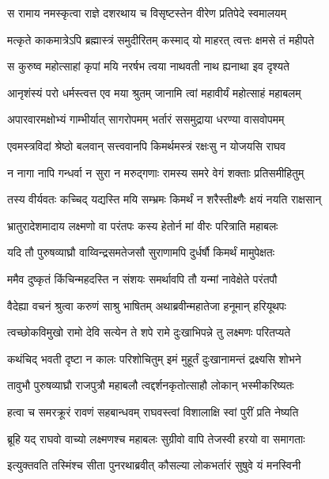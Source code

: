 \twolineshloka
{स रामाय नमस्कृत्वा राज्ञे दशरथाय च}
{विसृष्टस्तेन वीरेण प्रतिपेदे स्वमालयम्} %

\twolineshloka
{मत्कृते काकमात्रेऽपि ब्रह्मास्त्रं समुदीरितम्}
{कस्माद् यो माहरत् त्वत्तः क्षमसे तं महीपते} %

\twolineshloka
{स कुरुष्व महोत्साहां कृपां मयि नरर्षभ}
{त्वया नाथवती नाथ ह्यनाथा इव दृश्यते} %

\twolineshloka
{आनृशंस्यं परो धर्मस्त्वत्त एव मया श्रुतम्}
{जानामि त्वां महावीर्यं महोत्साहं महाबलम्} %

\twolineshloka
{अपारवारमक्षोभ्यं गाम्भीर्यात् सागरोपमम्}
{भर्तारं ससमुद्राया धरण्या वासवोपमम्} %

\twolineshloka
{एवमस्त्रविदां श्रेष्ठो बलवान् सत्त्ववानपि}
{किमर्थमस्त्रं रक्षःसु न योजयसि राघव} %

\twolineshloka
{न नागा नापि गन्धर्वा न सुरा न मरुद्गणाः}
{रामस्य समरे वेगं शक्ताः प्रतिसमीहितुम्} %

\twolineshloka
{तस्य वीर्यवतः कच्चिद् यद्यस्ति मयि सम्भ्रमः}
{किमर्थं न शरैस्तीक्ष्णैः क्षयं नयति राक्षसान्} %

\twolineshloka
{भ्रातुरादेशमादाय लक्ष्मणो वा परंतपः}
{कस्य हेतोर्न मां वीरः परित्राति महाबलः} %

\twolineshloka
{यदि तौ पुरुषव्याघ्रौ वाय्विन्द्रसमतेजसौ}
{सुराणामपि दुर्धर्षौ किमर्थं मामुपेक्षतः} %

\twolineshloka
{ममैव दुष्कृतं किंचिन्महदस्ति न संशयः}
{समर्थावपि तौ यन्मां नावेक्षेते परंतपौ} %

\twolineshloka
{वैदेह्या वचनं श्रुत्वा करुणं साश्रु भाषितम्}
{अथाब्रवीन्महातेजा हनूमान् हरियूथपः} %

\twolineshloka
{त्वच्छोकविमुखो रामो देवि सत्येन ते शपे}
{रामे दुःखाभिपन्ने तु लक्ष्मणः परितप्यते} %

\twolineshloka
{कथंचिद् भवती दृष्टा न कालः परिशोचितुम्}
{इमं मुहूर्तं दुःखानामन्तं द्रक्ष्यसि शोभने} %

\twolineshloka
{तावुभौ पुरुषव्याघ्रौ राजपुत्रौ महाबलौ}
{त्वद्दर्शनकृतोत्साहौ लोकान् भस्मीकरिष्यतः} %

\twolineshloka
{हत्वा च समरक्रूरं रावणं सहबान्धवम्}
{राघवस्त्वां विशालाक्षि स्वां पुरीं प्रति नेष्यति} %

\twolineshloka
{ब्रूहि यद् राघवो वाच्यो लक्ष्मणश्च महाबलः}
{सुग्रीवो वापि तेजस्वी हरयो वा समागताः} %

\twolineshloka
{इत्युक्तवति तस्मिंश्च सीता पुनरथाब्रवीत्}
{कौसल्या लोकभर्तारं सुषुवे यं मनस्विनी} %

